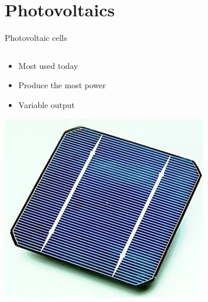 \documentclass{beamer}
\begin{document}
\section{Photovoltaics}

\begin{frame}{Photovoltaic cells}
 \begin{columns}
  

  \begin{column}{.5\textwidth}
    \begin{itemize}
      \item Most used today
      \item Produce the most power
      \item Variable output
    \end{itemize}
    \includegraphics[width=\textwidth]{./Slike/Solar_cell}
  \end{column}
  \begin{column}{.4\textwidth}

\end{column}
\end{columns}
\end{frame}
\end{document}

